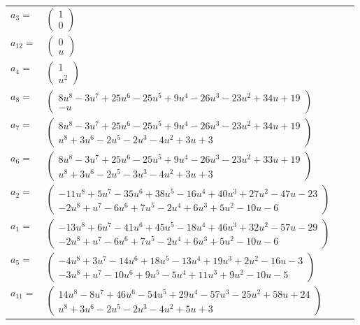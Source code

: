 \documentclass[1p]{elsarticle_modified}
\theoremstyle{definition}
\begin{document}
\begin{tabular}{m{7pt} m{180pt} m{7pt} m{180pt} }
\flushright $a_{3}=$&$\begin{pmatrix}1\\0\end{pmatrix}$ \\
\flushright $a_{12}=$&$\begin{pmatrix}0\\u\end{pmatrix}$ \\
\flushright $a_{4}=$&$\begin{pmatrix}1\\u^2\end{pmatrix}$ \\
\flushright $a_{8}=$&$\begin{pmatrix}8 u^8-3 u^7+25 u^6-25 u^5+9 u^4-26 u^3-23 u^2+34 u+19\\- u\end{pmatrix}$ \\
\flushright $a_{7}=$&$\begin{pmatrix}8 u^8-3 u^7+25 u^6-25 u^5+9 u^4-26 u^3-23 u^2+34 u+19\\u^8+3 u^6-2 u^5-2 u^3-4 u^2+3 u+3\end{pmatrix}$ \\
\flushright $a_{6}=$&$\begin{pmatrix}8 u^8-3 u^7+25 u^6-25 u^5+9 u^4-26 u^3-23 u^2+33 u+19\\u^8+3 u^6-2 u^5-3 u^3-4 u^2+3 u+3\end{pmatrix}$ \\
\flushright $a_{2}=$&$\begin{pmatrix}-11 u^8+5 u^7-35 u^6+38 u^5-16 u^4+40 u^3+27 u^2-47 u-23\\-2 u^8+u^7-6 u^6+7 u^5-2 u^4+6 u^3+5 u^2-10 u-6\end{pmatrix}$ \\
\flushright $a_{1}=$&$\begin{pmatrix}-13 u^8+6 u^7-41 u^6+45 u^5-18 u^4+46 u^3+32 u^2-57 u-29\\-2 u^8+u^7-6 u^6+7 u^5-2 u^4+6 u^3+5 u^2-10 u-6\end{pmatrix}$ \\
\flushright $a_{5}=$&$\begin{pmatrix}-4 u^8+3 u^7-14 u^6+18 u^5-13 u^4+19 u^3+2 u^2-16 u-3\\-3 u^8+u^7-10 u^6+9 u^5-5 u^4+11 u^3+9 u^2-10 u-5\end{pmatrix}$ \\
\flushright $a_{11}=$&$\begin{pmatrix}14 u^8-8 u^7+46 u^6-54 u^5+29 u^4-57 u^3-25 u^2+58 u+24\\u^8+3 u^6-2 u^5-2 u^3-4 u^2+5 u+3\end{pmatrix}$ \\

\end{tabular}
\end{document}
